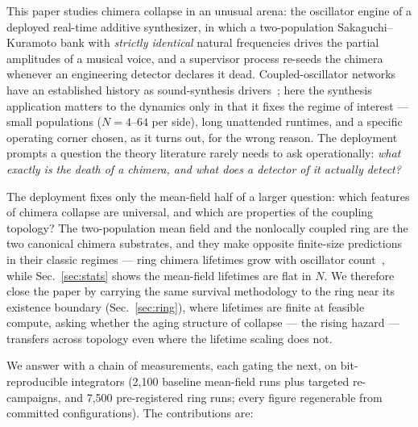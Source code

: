 \documentclass[pdflatex,sn-mathphys,Numbered]{sn-jnl}
\begin{document}
This paper studies chimera collapse in an unusual arena: the oscillator engine of a
deployed real-time additive synthesizer, in which a two-population
Sakaguchi--Kuramoto bank with \emph{strictly identical} natural frequencies drives
the partial amplitudes of a musical voice, and a supervisor process re-seeds the
chimera whenever an engineering detector declares it dead. Coupled-oscillator
networks have an established history as sound-synthesis drivers~\cite{lem2019,lemsmc};
here the synthesis application matters to the dynamics only in that it fixes the
regime of interest --- small populations ($N = 4$--$64$ per side), long unattended
runtimes, and a specific operating corner chosen, as it turns out, for the wrong
reason. The deployment prompts a question the theory literature rarely needs to ask
operationally: \emph{what exactly is the death of a chimera, and what does a detector
of it actually detect?}

The deployment fixes only the mean-field half of a larger question: which features
of chimera collapse are universal, and which are properties of the coupling
topology? The two-population mean field and the nonlocally coupled ring are the two
canonical chimera substrates, and they make opposite finite-size predictions in
their classic regimes --- ring chimera lifetimes grow with oscillator
count~\cite{wo2011}, while Sec.~\ref{sec:stats} shows the mean-field lifetimes are
flat in $N$. We therefore close the paper by carrying the same survival methodology
to the ring near its existence boundary (Sec.~\ref{sec:ring}), where lifetimes are
finite at feasible compute, asking whether the aging structure of collapse --- the
rising hazard --- transfers across topology even where the lifetime scaling does
not.

We answer with a chain of measurements, each gating the next, on bit-reproducible
integrators (2{,}100 baseline mean-field runs plus targeted re-campaigns, and
7{,}500 pre-registered ring runs; every figure regenerable from committed
configurations). The contributions are:
\end{document}
